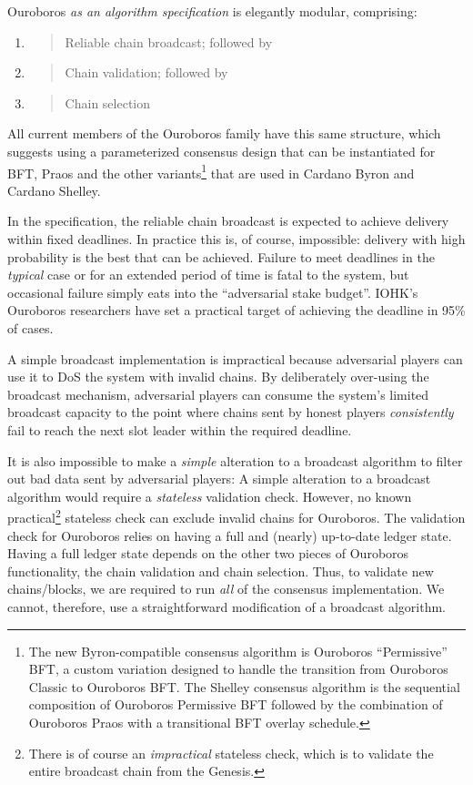 \documentclass[11pt,a4paper]{article}
\begin{document}
Ouroboros \emph{as an algorithm specification} is elegantly modular,
comprising:

\begin{enumerate}
\def\labelenumi{\arabic{enumi}.}
\item
  \begin{quote}
  Reliable chain broadcast; followed by
  \end{quote}
\item
  \begin{quote}
  Chain validation; followed by
  \end{quote}
\item
  \begin{quote}
  Chain selection
  \end{quote}
\end{enumerate}

All current members of the Ouroboros family have this same structure,
which suggests using a parameterized consensus design that can be
instantiated for BFT, Praos and the other variants\footnote{The new
  Byron-compatible consensus algorithm is Ouroboros ``Permissive'' BFT,
  a custom variation designed to handle the transition from Ouroboros
  Classic to Ouroboros BFT. The Shelley consensus algorithm is the
  sequential composition of Ouroboros Permissive BFT followed by the
  combination of Ouroboros Praos with a transitional BFT overlay
  schedule.} that are used in Cardano Byron and Cardano Shelley.

In the specification, the reliable chain broadcast is expected to
achieve delivery within fixed deadlines. In practice this is, of course,
impossible: delivery with high probability is the best that can be
achieved. Failure to meet deadlines in the \emph{typical} case or for an
extended period of time is fatal to the system, but occasional failure
simply eats into the ``adversarial stake budget''. IOHK's Ouroboros
researchers have set a practical target of achieving the deadline in
95\% of cases.

A simple broadcast implementation is impractical because adversarial
players can use it to DoS the system with invalid chains. By
deliberately over-using the broadcast mechanism, adversarial players can
consume the system's limited broadcast capacity to the point where
chains sent by honest players \emph{consistently} fail to reach the next
slot leader within the required deadline.

It is also impossible to make a \emph{simple} alteration to a broadcast
algorithm to filter out bad data sent by adversarial players: A simple
alteration to a broadcast algorithm would require a \emph{stateless}
validation check. However, no known practical\footnote{There is of
  course an \emph{impractical} stateless check, which is to validate the
  entire broadcast chain from the Genesis.} stateless check can exclude
invalid chains for Ouroboros. The validation check for Ouroboros relies
on having a full and (nearly) up-to-date ledger state. Having a full
ledger state depends on the other two pieces of Ouroboros functionality,
the chain validation and chain selection. Thus, to validate new
chains/blocks, we are required to run \emph{all} of the consensus
implementation. We cannot, therefore, use a straightforward modification
of a broadcast algorithm.
\end{document}
